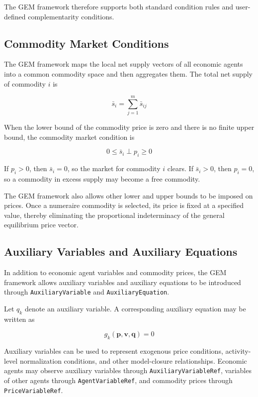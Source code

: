 \documentclass[
  letterpaper,
  DIV=11,
  numbers=noendperiod]{scrreprt}
\begin{document}
The GEM framework therefore supports both standard condition rules and
user-defined complementarity conditions.

\subsection{Commodity Market
Conditions}\label{commodity-market-conditions}

The GEM framework maps the local net supply vectors of all economic
agents into a common commodity space and then aggregates them. The total
net supply of commodity \(i\) is

\[
\bar s_i
=
\sum_{j=1}^{m}\bar s_{ij}
\]

When the lower bound of the commodity price is zero and there is no
finite upper bound, the commodity market condition is

\[
0
\leq
\bar s_i
\perp
p_i
\geq
0
\]

If \(p_i>0\), then \(\bar s_i=0\), so the market for commodity \(i\)
clears. If \(\bar s_i>0\), then \(p_i=0\), so a commodity in excess
supply may become a free commodity.

The GEM framework also allows other lower and upper bounds to be imposed
on prices. Once a numeraire commodity is selected, its price is fixed at
a specified value, thereby eliminating the proportional indeterminacy of
the general equilibrium price vector.

\subsection{Auxiliary Variables and Auxiliary
Equations}\label{auxiliary-variables-and-auxiliary-equations}

In addition to economic agent variables and commodity prices, the GEM
framework allows auxiliary variables and auxiliary equations to be
introduced through \texttt{AuxiliaryVariable} and
\texttt{AuxiliaryEquation}.

Let \(q_k\) denote an auxiliary variable. A corresponding auxiliary
equation may be written as

\[
g_k(\mathbf p,\mathbf v,\mathbf q)=0
\]

Auxiliary variables can be used to represent exogenous price conditions,
activity-level normalization conditions, and other model-closure
relationships. Economic agents may observe auxiliary variables through
\texttt{AuxiliaryVariableRef}, variables of other agents through
\texttt{AgentVariableRef}, and commodity prices through
\texttt{PriceVariableRef}.
\end{document}
